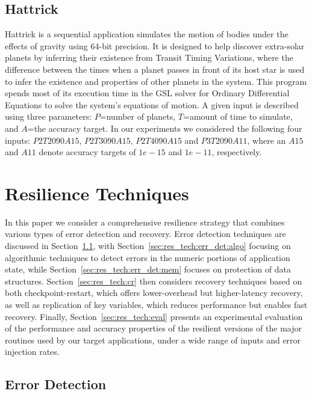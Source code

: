\documentclass{sig-alternate}
\begin{document}
\subsection{Hattrick}
\label{sec:apps:hattrick}
Hattrick is a sequential application simulates the motion of bodies under the effects of gravity using 64-bit precision.
It is designed to help discover extra-solar planets by inferring their existence from Transit Timing Variations, where the difference between the times when a planet passes in front of its host star is used to infer the existence and properties of other planets in the system.
This program spends most of its execution time in the GSL solver for Ordinary Differential Equations to solve the system's equations of motion.
A given input is described using three parameters: $P$=number of planets, $T$=amount of time to simulate, and $A$=the accuracy target.
In our experiments we considered the following four inputs: $P2T2090A15$, $P2T3090A15$, $P2T4090A15$ and $P3T2090A11$, where an $A15$ and $A11$ denote accuracy targets of $1e-15$ and $1e-11$, respectively.

\section{Resilience Techniques}
\label{sec:res_tech}

In this paper we consider a comprehensive resilience strategy that combines various types of error detection and recovery.
Error detection techniques are discussed in Section~\ref{sec:res_tech:err_det}, with Section~\ref{sec:res_tech:err_det:algo} focusing on algorithmic techniques to detect errors in the numeric portions of application state, while Section~\ref{sec:res_tech:err_det:mem} focuses on protection of data structures.
Section~\ref{sec:res_tech:cr} then considers recovery techniques based on both checkpoint-restart, which offers lower-overhead but higher-latency recovery, as well as replication of key variables, which reduces performance but enables fast recovery.
Finally, Section~\ref{sec:res_tech:eval} presents an experimental evaluation of the performance and accuracy properties of the resilient versions of the major routines used by our target applications, under a wide range of inputs and error injection rates.

\subsection{Error Detection}
\label{sec:res_tech:err_det}
\end{document}
